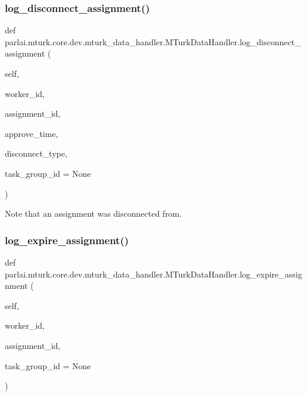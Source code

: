 \subsubsection{\texorpdfstring{log\+\_\+disconnect\+\_\+assignment()}{log\_disconnect\_assignment()}}
{\footnotesize\ttfamily def parlai.\+mturk.\+core.\+dev.\+mturk\+\_\+data\+\_\+handler.\+M\+Turk\+Data\+Handler.\+log\+\_\+disconnect\+\_\+assignment (\begin{DoxyParamCaption}\item[{}]{self,  }\item[{}]{worker\+\_\+id,  }\item[{}]{assignment\+\_\+id,  }\item[{}]{approve\+\_\+time,  }\item[{}]{disconnect\+\_\+type,  }\item[{}]{task\+\_\+group\+\_\+id = {\ttfamily None} }\end{DoxyParamCaption})}

\begin{DoxyVerb}Note that an assignment was disconnected from.
\end{DoxyVerb}
 \mbox{\label{classparlai_1_1mturk_1_1core_1_1dev_1_1mturk__data__handler_1_1MTurkDataHandler_ab175fd5970bfd7b24751ad99e7b99111}} 
\subsubsection{\texorpdfstring{log\+\_\+expire\+\_\+assignment()}{log\_expire\_assignment()}}
{\footnotesize\ttfamily def parlai.\+mturk.\+core.\+dev.\+mturk\+\_\+data\+\_\+handler.\+M\+Turk\+Data\+Handler.\+log\+\_\+expire\+\_\+assignment (\begin{DoxyParamCaption}\item[{}]{self,  }\item[{}]{worker\+\_\+id,  }\item[{}]{assignment\+\_\+id,  }\item[{}]{task\+\_\+group\+\_\+id = {\ttfamily None} }\end{DoxyParamCaption})}

